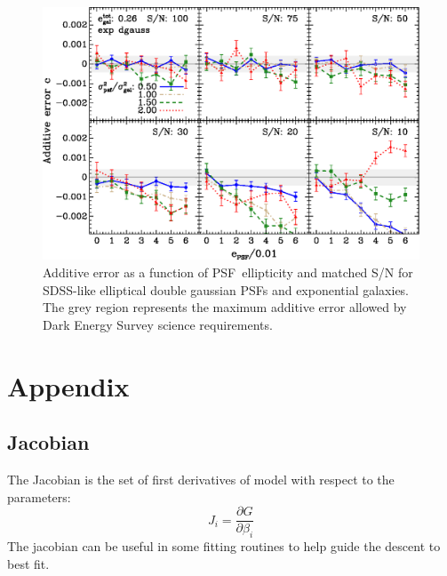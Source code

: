 \documentclass[10pt,preprint]{aastex}
\newcommand{\psf}{PSF}
\begin{document}
\begin{figure}[t] \centering
 \centering 
 \includegraphics[scale=1]{figures/set-epsf-edg01-yr-0.003-0.003-vs-epsf.eps}

 \caption{Additive error as a function of \psf\ ellipticity and matched S/N for
 SDSS-like elliptical double gaussian \psf s and exponential galaxies.  The grey
 region represents the maximum additive error allowed by Dark
 Energy Survey science requirements.  }

 \label{fig:edgadderr}

\end{figure}







\appendix 

\section{Appendix}
\subsection{Jacobian}

The Jacobian is the set of first derivatives of model with respect
to the parameters:
\begin{equation}
J_i = \frac{\partial G}{\partial \beta_i}
\end{equation}
The jacobian can be useful in some fitting routines to help guide the descent
to best fit.
\end{document}
